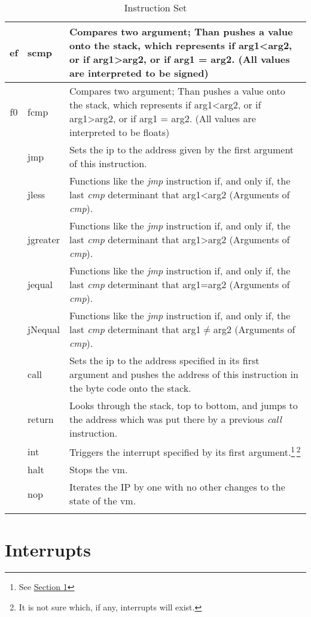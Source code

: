 \documentclass[10pt,a4paper]{article}
\makeatletter
\newcommand\footnoteref[1]{\protected@xdef\@thefnmark{\ref{#1}}\@footnotemark}
\makeatother
\begin{document}
\begin{longtable}[c]{c|l|p{9cm}}
		\hline
		\hex ef & scmp & Compares two argument; Than pushes a value onto the stack, which represents if arg1\textless arg2, or if arg1\textgreater arg2, or if arg1 = arg2.\footnoteref{cmp_footnote} (All values are interpreted to be signed) \\
		\hline
		\hex f0 & fcmp & Compares two argument; Than pushes a value onto the stack, which represents if arg1\textless arg2, or if arg1\textgreater arg2, or if arg1 = arg2.\footnoteref{cmp_footnote} (All values are interpreted to be floats) \\
		\hline		
		\hline
		\hex 01 & jmp & Sets the ip to the address given by the first argument of this instruction. \\
		\hline
		\hex 02 & jless & Functions like the \textit{jmp} instruction if, and only if, the last \textit{cmp} determinant that arg1\textless arg2 (Arguments of \textit{cmp}). \\
		\hline
		\hex 03 & jgreater & Functions like the \textit{jmp} instruction if, and only if, the last \textit{cmp} determinant that arg1\textgreater arg2 (Arguments of \textit{cmp}). \\
		\hline
		\hex 04 & jequal & Functions like the \textit{jmp} instruction if, and only if, the last \textit{cmp} determinant that arg1=arg2 (Arguments of \textit{cmp}). \\
		\hline
		\hex 05 & jNequal & Functions like the \textit{jmp} instruction if, and only if, the last \textit{cmp} determinant that arg1\(\neq \)arg2 (Arguments of \textit{cmp}). \\
		\hline
		\hex 06 & call & Sets the ip to the address specified in its first argument and pushes the address of this instruction in the byte code onto the stack. \\
		\hline
		\hex 07 & return & Looks through the stack, top to bottom, and jumps to the address which was put there by a previous \textit{call} instruction. \\
		\hline
		\hline
		\hex 10 & int & Triggers the interrupt specified by its first argument.\footnote{See \hyperref[interrupts]{Section \ref*{interrupts}}}\,\footnote{It is not sure which, if any, interrupts will exist.} \\
		\hline
		\hex 11 & halt & Stops the vm. \\
		\hline
		\hex 12 & nop & Iterates the IP by one with no other changes to the state of the vm. \\
		\hline
		\caption{Instruction Set}
		\end{longtable}
	\section{Interrupts}
	\label{interrupts}
		
\end{document}

